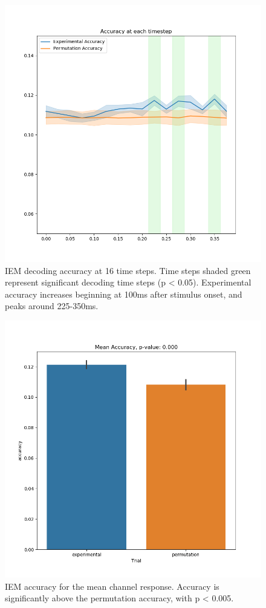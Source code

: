 \documentclass[../main.tex]{subfiles}
\begin{document}
\begin{figure}
    \centering
    \includegraphics[scale=0.7]{figures/results/timestep_accuracy_iem.png}
    \caption{IEM decoding accuracy at 16 time steps. Time steps shaded green represent significant decoding time steps (p < 0.05). Experimental accuracy increases beginning at 100ms after stimulus onset, and peaks around 225-350ms.}
    \label{timestep_accuracy_iem}
\end{figure}

\begin{figure}
    \centering
    \includegraphics[scale=0.7]{figures/results/accuracy_iem.png}
    \caption{IEM accuracy for the mean channel response. Accuracy is significantly above the permutation accuracy, with p < 0.005.}
    \label{iem_accuracy}
\end{figure}
\end{document}

